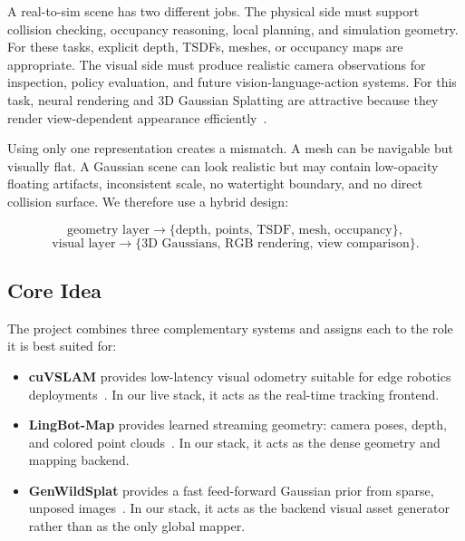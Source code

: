 \documentclass[11pt]{article}
\begin{document}
A real-to-sim scene has two different jobs. The physical side must support collision checking, occupancy reasoning, local planning, and simulation geometry. For these tasks, explicit depth, TSDFs, meshes, or occupancy maps are appropriate. The visual side must produce realistic camera observations for inspection, policy evaluation, and future vision-language-action systems. For this task, neural rendering and 3D Gaussian Splatting are attractive because they render view-dependent appearance efficiently~\cite{kerbl2023gaussians}.

Using only one representation creates a mismatch. A mesh can be navigable but visually flat. A Gaussian scene can look realistic but may contain low-opacity floating artifacts, inconsistent scale, no watertight boundary, and no direct collision surface. We therefore use a hybrid design:

\begin{equation}
\text{geometry layer} \rightarrow \{\text{depth, points, TSDF, mesh, occupancy}\},
\end{equation}
\begin{equation}
\text{visual layer} \rightarrow \{\text{3D Gaussians, RGB rendering, view comparison}\}.
\end{equation}

\subsection{Core Idea}

The project combines three complementary systems and assigns each to the role it is best suited for:

\begin{itemize}
    \item \textbf{cuVSLAM} provides low-latency visual odometry suitable for edge robotics deployments~\cite{korovko2025cuvslam}. In our live stack, it acts as the real-time tracking frontend.
    \item \textbf{LingBot-Map} provides learned streaming geometry: camera poses, depth, and colored point clouds~\cite{chen2026lingbot}. In our stack, it acts as the dense geometry and mapping backend.
    \item \textbf{GenWildSplat} provides a fast feed-forward Gaussian prior from sparse, unposed images~\cite{gupta2026genwildsplat}. In our stack, it acts as the backend visual asset generator rather than as the only global mapper.
\end{itemize}
\end{document}
